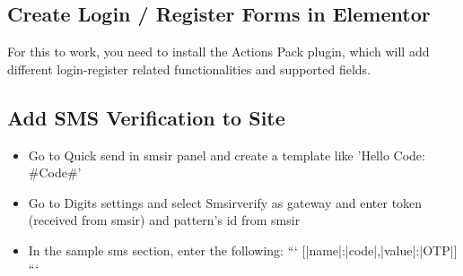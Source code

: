 \documentclass{article}
\begin{document}
\subsection{Create Login / Register Forms in Elementor}
For this to work, you need to install the Actions Pack plugin, which will add different login-register related functionalities and supported fields. 

\subsection{Add SMS Verification to Site}
\begin{itemize}
  \item Go to Quick send in smsir panel and create a template like 'Hello Code: \#Code\#'
  \item Go to Digits settings and select Smsirverify as gateway and enter token (received from smsir) and pattern's id from smsir
  \item In the sample sms section, enter the following:
  ```
  [{|name|:|code|,|value|:|{OTP}|}]
  ```
\end{itemize}
\end{document}

